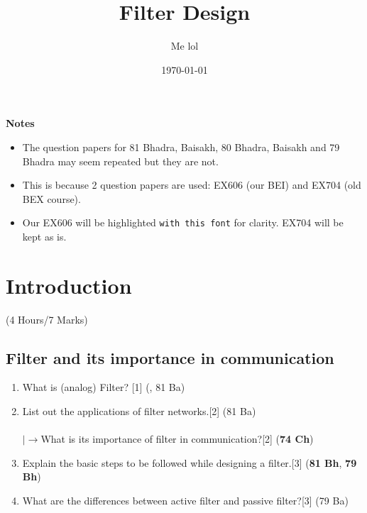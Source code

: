 \documentclass[12pt]{article}
\title{Filter Design}
\author{Me lol}
\date{\today}
\newcommand{\lb}{\\$\left|\rightarrow\right.$}
\begin{document}
\maketitle
\vspace{10cm}
\textbf{Notes}
\begin{itemize}
\item The question papers for 81 Bhadra, Baisakh, 80 Bhadra, Baisakh and 79 Bhadra may seem repeated but they are not.
\item This is because 2 question papers are used: EX606 (our BEI) and EX704 (old BEX course).
\item Our EX606 will be highlighted \texttt{with this font} for clarity. EX704 will be kept as is.
\end{itemize}
\pagebreak
\tableofcontents
\pagebreak

\section{Introduction}
\begin{center}(4 Hours/7 Marks)\end{center}
\subsection{Filter and its importance in communication}
\begin{enumerate}
\item What is (analog) Filter? \hfill [1] (, 81 Ba)
\item List out the applications of filter networks.\hfill[2] (81 Ba)\\
\lb What is its importance of filter in communication?\hfill[2] (\textbf{74 Ch})
\item Explain the basic steps to be followed while designing a filter.\hfill[3] (\textbf{81 Bh}, \textbf{79 Bh})
\item What are the differences between active filter and passive filter?\hfill[3] (79 Ba)
\end{enumerate}
\end{document}
